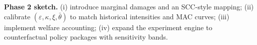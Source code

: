 \documentclass[12pt,a4paper]{article}
\begin{document}
\begin{mdframed}[backgroundcolor=gray!10,linewidth=0.5pt]
\textbf{Phase 2 sketch.} (i) introduce marginal damages and an SCC-style mapping; (ii) calibrate $(\varepsilon,\kappa,\xi,\bar\theta)$ to match historical intensities and MAC curves; (iii) implement welfare accounting; (iv) expand the experiment engine to counterfactual policy packages with sensitivity bands.
\end{mdframed}
\end{document}
